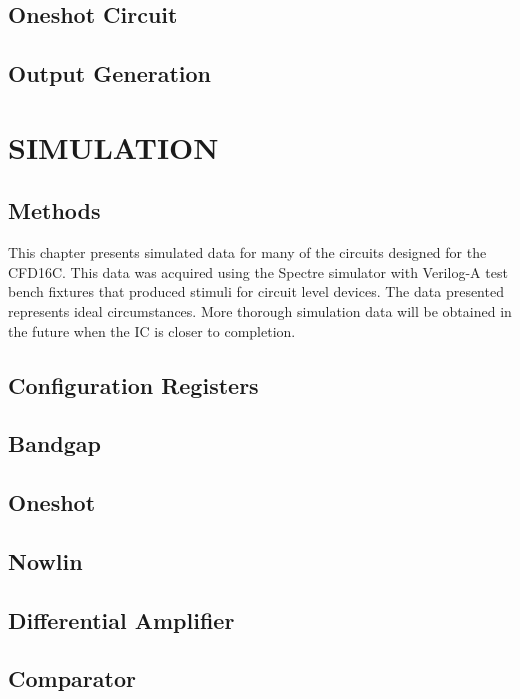 \documentclass[12pt,oneside,final]{siuethesis}
\theoremstyle{definition}
\begin{document}
\section{Oneshot Circuit}

\section{Output Generation}

\chapter{SIMULATION}
\section{Methods}
\par This chapter presents simulated data for many of the circuits designed for the CFD16C. This data was acquired using the Spectre simulator with Verilog-A test bench fixtures that produced stimuli for circuit level devices. The data presented represents ideal circumstances. More thorough simulation data will be obtained in the future when the IC is closer to completion.

\section{Configuration Registers}

\section{Bandgap}

\section{Oneshot}

\section{Nowlin}

\section{Differential Amplifier}

\section{Comparator}
\end{document}
